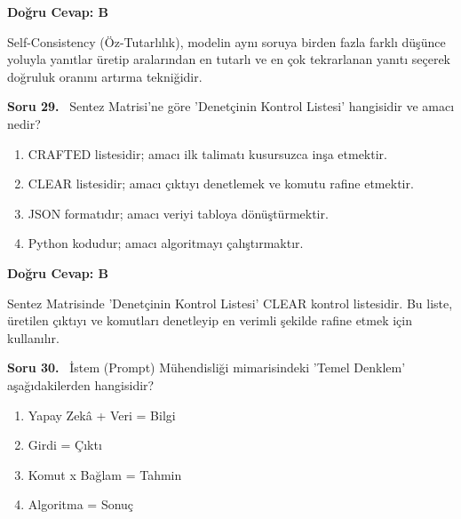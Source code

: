 \documentclass[11pt,a4paper,openany]{book}
\begin{document}
\vspace{4pt}
\begin{tcolorbox}[title=Cevap ve Açıklama, colback=gray!3!white, colframe=primarycolor!90!black, arc=2mm, fonttitle=\bfseries\sffamily, top=6pt, bottom=6pt]
    \textbf{Doğru Cevap: B}

    \vspace{2pt}
    Self-Consistency (Öz-Tutarlılık), modelin aynı soruya birden fazla farklı düşünce yoluyla yanıtlar üretip aralarından en tutarlı ve en çok tekrarlanan yanıtı seçerek doğruluk oranını artırma tekniğidir.
\end{tcolorbox}
\vspace{10pt}
\needspace{5cm}
\vspace{8pt}
\noindent\textbf{\large\sffamily Soru 29.} \ Sentez Matrisi'ne göre 'Denetçinin Kontrol Listesi' hangisidir ve amacı nedir?

\begin{enumerate}[label=\Alph*), leftmargin=25pt, topsep=4pt, itemsep=2pt]
        \item CRAFTED listesidir; amacı ilk talimatı kusursuzca inşa etmektir.
        \item CLEAR listesidir; amacı çıktıyı denetlemek ve komutu rafine etmektir.
        \item JSON formatıdır; amacı veriyi tabloya dönüştürmektir.
        \item Python kodudur; amacı algoritmayı çalıştırmaktır.
\end{enumerate}

\vspace{4pt}
\begin{tcolorbox}[title=Cevap ve Açıklama, colback=gray!3!white, colframe=primarycolor!90!black, arc=2mm, fonttitle=\bfseries\sffamily, top=6pt, bottom=6pt]
    \textbf{Doğru Cevap: B}

    \vspace{2pt}
    Sentez Matrisinde 'Denetçinin Kontrol Listesi' CLEAR kontrol listesidir. Bu liste, üretilen çıktıyı ve komutları denetleyip en verimli şekilde rafine etmek için kullanılır.
\end{tcolorbox}
\vspace{10pt}
\needspace{5cm}
\vspace{8pt}
\noindent\textbf{\large\sffamily Soru 30.} \ İstem (Prompt) Mühendisliği mimarisindeki 'Temel Denklem' aşağıdakilerden hangisidir?

\begin{enumerate}[label=\Alph*), leftmargin=25pt, topsep=4pt, itemsep=2pt]
        \item Yapay Zekâ + Veri = Bilgi
        \item Girdi = Çıktı
        \item Komut x Bağlam = Tahmin
        \item Algoritma = Sonuç
\end{enumerate}
\end{document}
